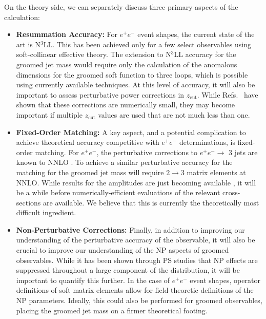\documentclass[11pt]{cernrep}
\begin{document}
On the theory side, we can separately discuss three primary aspects of the calculation:
%
\begin{itemize}
\item {\bf Resummation Accuracy:} For $e^+e^-$ event shapes, the current state of the art is N$^3$LL.
%
This has been achieved only for a few select observables using soft-collinear effective theory.
%
The extension to N$^3$LL accuracy for the groomed jet mass would require only the calculation of the anomalous dimensions for the groomed soft function to three loops, which is possible using currently available techniques.
%
At this level of accuracy, it will also be important to assess perturbative power corrections in $z_{\mathrm{cut}}$.
%
While Refs.~\cite{Marzani:2017kqd,Marzani:2017mva} have shown that these corrections are numerically small, they may become important if multiple $z_{\mathrm{cut}}$ values are used that are not much less than one.
%
\item {\bf Fixed-Order Matching:} A key aspect, and a potential complication to achieve theoretical accuracy competitive with $e^+e^-$ determinations, is fixed-order matching.
%
For $e^+e^-$, the perturbative corrections to $e^+e^- \rightarrow$ 3 jets are known to NNLO \cite{GehrmannDeRidder:2007hr,Gehrmann-DeRidder:2007nzq,Weinzierl:2008iv,Weinzierl:2009ms}.
%
To achieve a similar perturbative accuracy for the matching for the groomed jet mass will require $2\rightarrow 3$ matrix elements at NNLO.
%
While results for the amplitudes are just becoming available \cite{Gehrmann:2015bfy,Dunbar:2016aux,Badger:2013yda,Badger:2017jhb,Abreu:2017hqn}, it will be a while before numerically-efficient evaluations of the relevant cross-sections are available.
%
We believe that this is currently the theoretically most difficult ingredient.
%
\item {\bf Non-Perturbative Corrections:} Finally, in addition to improving our understanding of the perturbative accuracy of the observable, it will also be crucial to improve our understanding of the NP aspects of groomed observables.
%
While it has been shown through PS studies that NP effects are suppressed throughout a large component of the distribution, it will be important to quantify this further.
%
In the case of $e^+e^-$ event shapes, operator definitions of soft matrix elements allow for field-theoretic definitions of the NP parameters.
%
Ideally, this could also be performed for groomed observables, placing the groomed jet mass on a firmer theoretical footing.
%
\end{itemize}
\end{document}

